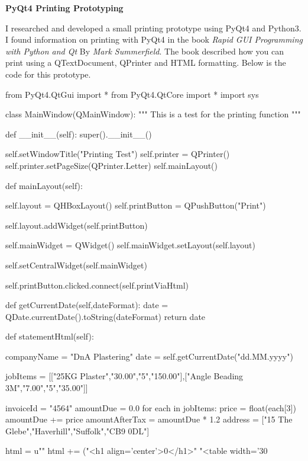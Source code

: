 \textbf{PyQt4 Printing Prototyping}
\begin{flushleft}
I researched and developed a small printing prototype using PyQt4 and Python3. I found information on printing with PyQt4 in the book \emph{Rapid GUI Programming with Python and Qt} By \emph{Mark Summerfield}. The book described how you can print using a QTextDocument, QPrinter and HTML formatting. Below is the code for this prototype.
\end{flushleft}
\begin{python}
from PyQt4.QtGui import *
from PyQt4.QtCore import *
import sys


class MainWindow(QMainWindow):
    """ This is a test for the printing function """

    def __init__(self):
        super().__init__()


        self.setWindowTitle("Printing Test")
        self.printer = QPrinter()
        self.printer.setPageSize(QPrinter.Letter)
        self.mainLayout()

        
    def mainLayout(self):

        self.layout = QHBoxLayout()
        self.printButton = QPushButton("Print")

        self.layout.addWidget(self.printButton)

        self.mainWidget = QWidget()
        self.mainWidget.setLayout(self.layout)

        self.setCentralWidget(self.mainWidget)

        self.printButton.clicked.connect(self.printViaHtml)

    def getCurrentDate(self,dateFormat):
        date = QDate.currentDate().toString(dateFormat)
        return date

    def statementHtml(self):

        companyName = "DnA Plastering"
        date = self.getCurrentDate("dd.MM.yyyy")

        jobItems = [["25KG Plaster","30.00","5","150.00"],["Angle Beading 3M","7.00","5","35.00"]]

        invoiceId = "4564"
        amountDue = 0.0
        for each in jobItems:
            price = float(each[3])
            amountDue += price
        amountAfterTax = amountDue * 1.2
        address = ["15 The Glebe","Haverhill","Suffolk","CB9 0DL"]
        
            
            
        
        html = u""
        html += ("<h1 align='center'>{0}</h1>"
                 "<table width='30%


\end{python}
